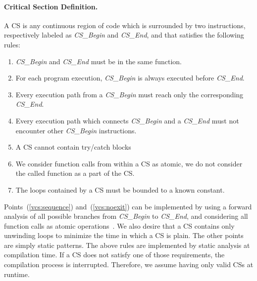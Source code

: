 \paragraph{Critical Section Definition.}
A CS is any continuous region of code which is surrounded by two instructions, 
respectively labeled as \emph{CS\_Begin} and \emph{CS\_End}, and that satisfies 
the following rules:

\begin{enumerate}
	\item\label{vcs:function} \emph{CS\_Begin} and \emph{CS\_End} must be in 
	the same function.
	\item\label{vcs:sequence} For each program execution, \emph{CS\_Begin} is 
	always executed before \emph{CS\_End}.
	\item\label{vcs:noexit} Every execution path from a \emph{CS\_Begin} must 
	reach only the corresponding \emph{CS\_End}.
	\item\label{vcs:nooverlap} Every execution path which connects 
	\emph{CS\_Begin} and a \emph{CS\_End} must not encounter other 
	\emph{CS\_Begin} instructions.
	\item A CS cannot contain try/catch blocks
	\item We consider function calls from within a CS as atomic,	\ie we do 
	not consider the called function as a part of the CS.
	\item\label{vcs:loops} The loops contained by a CS must be bounded to a 
	known constant.
\end{enumerate}
Points~(\ref{vcs:sequence}) and~(\ref{vcs:noexit}) can be implemented by using 
a forward analysis of all possible branches from \emph{CS\_Begin} to 
\emph{CS\_End}, and considering all function calls as atomic 
operations~\citep{moller2012static}.
We also desire that a CS contains only unwinding loops to minimize the time in 
which a CS is plain.
The other points are simply static patterns.
The above rules are implemented by static analysis at compilation time.
If a CS does not satisfy one of those requirements, the compilation process is 
interrupted.
Therefore, we assume having only valid CSs at runtime.

